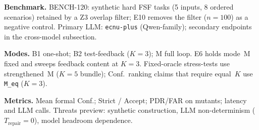 \textbf{Benchmark.}
BENCH-120: synthetic hard FSF tasks (5 inputs, 8 ordered scenarios) retained by
a Z3 overlap filter; E10 removes the filter ($n{=}100$) as a negative control.
Primary LLM: \texttt{ecnu-plus} (Qwen-family); secondary endpoints in the
cross-model subsection.

\textbf{Modes.}
B1 one-shot; B2 test-feedback ($K{=}3$); M full loop.
E6 holds mode~M fixed and sweeps feedback content at $K{=}3$.
Fixed-oracle stress-tests use strengthened~M ($K{=}5$ bundle); Conf.\ ranking
claims that require equal~$K$ use \texttt{M\_eq} ($K{=}3$).

\textbf{Metrics.}
Mean formal Conf.; Strict / $\mathrm{Accept}$; PDR/FAR on mutants; latency and
LLM calls.
Threats preview: synthetic construction, LLM non-determinism
($T_\text{repair}{=}0$), model headroom dependence.
